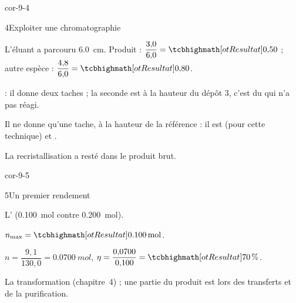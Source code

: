 \begin{blocLivre}{cor-9-4}
\begin{corrige}{4}{Exploiter une chromatographie}
\begin{questions}
\item L'éluant a parcouru \qty{6,0}{cm}. Produit : $\dfrac{3{,}0}{6{,}0}=\res{0{,}50}$ ; autre espèce : $\dfrac{4{,}8}{6{,}0}=\res{0{,}80}$.
\item {} : il donne deux taches ; la seconde est à la hauteur du dépôt 3, c'est du  qui n'a pas réagi.
\item Il ne donne qu'une tache, à la hauteur de la référence : il est  (pour cette technique) et .
\item La recristallisation a  resté dans le produit brut.
\end{questions}
\end{corrige}
\end{blocLivre}
\begin{blocLivre}{cor-9-5}
\begin{corrige}{5}{Un premier rendement}
\begin{questions}
\item L' (\qty{0,100}{mol} contre \qty{0,200}{mol}).
\item $n_\text{max}=\res{\qty{0,100}{mol}}$.
\item $n=\dfrac{9{,}1}{130{,}0}=\qty{0,0700}{mol}$, $\eta=\dfrac{0{,}0700}{0{,}100}=\res{\qty{70}{\percent}}$.
\item La transformation  (chapitre~4) ; une partie du produit est  lors des transferts et de la
purification.
\end{questions}
\end{corrige}
\end{blocLivre}

